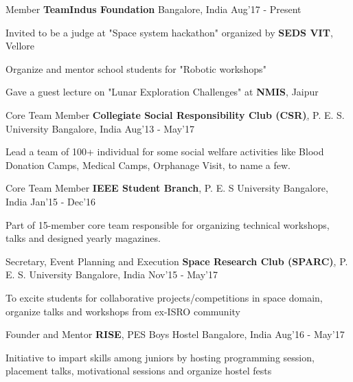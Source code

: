 \begin{cventries}
	\cventry
	{Member}
	{\textbf{TeamIndus Foundation}}
	{Bangalore, India}
	{Aug'17 - Present}
	{
		\begin{cvitems}
		\item{Invited to be a judge at "Space system hackathon" organized by \textbf{SEDS VIT}, Vellore}
		\item{Organize and mentor school students for "Robotic workshops"}
		\item{Gave a guest lecture on "Lunar Exploration Challenges" at \textbf{NMIS}, Jaipur}
		\end{cvitems}
	}

	\cventry
	{Core Team Member}
	{\textbf{Collegiate Social Responsibility Club (CSR)}\href{http://pes.edu/clubs/pes-csr-club/}, P. E. S. University}
	{Bangalore, India}
	{Aug'13 - May'17}
	{
		\begin{cvitems}
		\item{Lead a team of 100+ individual for some social welfare activities like Blood Donation Camps, Medical Camps, Orphanage Visit, to name a few.}
		\end{cvitems}
	}

	\cventry
	{Core Team Member}
	{\textbf{IEEE Student Branch}\href{http://ieee.pes.edu/}, P. E. S University}
	{Bangalore, India}
	{Jan'15 - Dec'16}
	{
		\begin{cvitems}
		\item{Part of 15-member core team responsible for organizing technical workshops, talks and designed yearly magazines.}
		\end{cvitems}
	}

	\cventry
	{Secretary, Event Planning and Execution}
	{\textbf{Space Research Club (SPARC)}\href{https://www.facebook.com/Space-Research-Club-Of-PES-University-487153011445398/?tn-str=k*F}, P. E. S. University}
	{Bangalore, India}
	{Nov'15 - May'17}
	{
		\begin{cvitems}
		\item{To excite students for collaborative projects/competitions in space domain, organize talks and workshops from ex-ISRO community}
		\end{cvitems}
	}

	\cventry
	{Founder and Mentor}
	{\textbf{RISE}, PES Boys Hostel}
	{Bangalore, India}
	{Aug'16 - May'17}
	{
		\begin{cvitems}
		\item{Initiative to impart skills among juniors by hosting programming session, placement talks, motivational sessions and organize hostel fests}
		\end{cvitems}
	}


\end{cventries}
